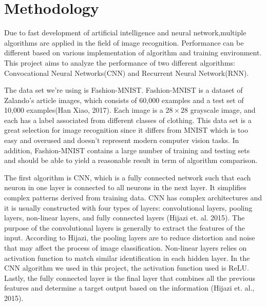 \documentclass[letterpaper]{article} %
\begin{document}
\section{Methodology}

Due to fast development of artificial intelligence and neural network,multiple algorithms are applied in the field of image recognition. Performance can be different based on various implementation of algorithm and training environment. This project aims to analyze the performance of two different algorithms: Convocational Neural Networks(CNN) and Recurrent Neural Network(RNN).

The data set we're using is Fashion-MNIST. Fashion-MNIST is a dataset of Zalando's article images, which consists of 60,000 examples and a test set of 10,000 examples(Han Xiao, 2017). Each image is a $28 \times 28$ grayscale image, and each has a label associated from different classes of clothing. This data set is a great selection for image recognition since it differs from MNIST which is too easy and overused and doesn't represent modern computer vision tasks. In addition, Fashion-MNIST contains a large number of training and testing sets and should be able to yield a reasonable result in term of algorithm comparison.

The first algorithm is CNN, which is a fully connected network such that each neuron in one layer is connected to all neurons in the next layer. It simplifies complex patterns derived from training data. CNN has complex architectures and it is usually constructed with four types of layers: convolutional layers, pooling layers, non-linear layers, and fully connected layers (Hijazi et. al. 2015). The purpose of the convolutional layers is generally to extract the features of the input. According to Hijazi, the pooling layers are to reduce distortion and noise that may affect the process of image classification. Non-linear layers relies on activation function to match similar identification in each hidden layer. In the CNN algorithm we used in this project, the activation function used is ReLU. Lastly, the fully connected layer is the final layer that combines all the previous features and determine a target output based on the information (Hijazi et. al., 2015).
\end{document}
